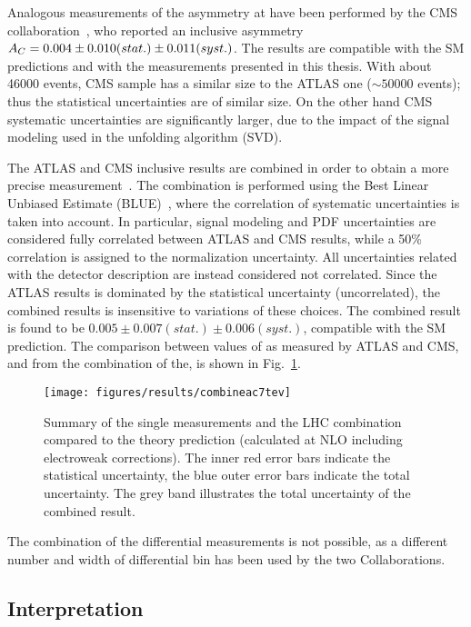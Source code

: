 Analogous measurements of the asymmetry \ac{} at \seventev{} have been
performed by the CMS collaboration~\cite{Chatrchyan:2012cxa}, who
reported an inclusive asymmetry
$A_C{}=0.004\pm0.010(stat.)\pm0.011(syst.)$.
The results are compatible with the SM predictions and with the
measurements presented in this thesis. 
With about 46000 \ttbar{} events, CMS sample has a similar size to the
ATLAS one ($\sim50000$ events); thus the statistical uncertainties are
of similar size. On the other hand CMS systematic uncertainties are
significantly larger, due to the impact of the signal modeling used in the
unfolding algorithm (SVD).

The ATLAS and CMS inclusive \ac{} results are combined in order to
obtain a more precise measurement~\cite{ATLAS-CONF-2014-012}. The
combination is performed using the Best Linear Unbiased Estimate
(BLUE)~\cite{Lyons:1988rp,Valassi:2003mu}, where the correlation of
systematic uncertainties is taken into account. In particular, signal
modeling and PDF uncertainties are considered fully correlated between
ATLAS and CMS results, while a 50\% correlation is assigned to the
\wjets{} normalization uncertainty. All uncertainties related with the
detector description are instead considered not correlated. Since the
ATLAS results is dominated by the statistical uncertainty
(uncorrelated), the combined results is insensitive to variations of
these choices. The combined result is found to be
$0.005\pm0.007(stat.)\pm0.006(syst.)$, compatible with the SM
prediction. The comparison between values of \ac{} as measured by
ATLAS and CMS, and from the combination of the, is shown in
Fig.~\ref{fig:combineac}.
\begin{figure}[!htb]\centering
  \texttt{[image: figures/results/combineac7tev]} 
  \caption{Summary of the single \ac{} measurements and the LHC
    combination compared to the theory prediction (calculated at NLO
    including electroweak corrections). The inner red error bars
    indicate the statistical uncertainty, the blue outer error bars
    indicate the total uncertainty. The grey band illustrates the
    total uncertainty of the combined result.} 
  \label{fig:combineac}
\end{figure}
The combination of the differential measurements is not possible, as a
different number and width of differential bin has been used by the
two Collaborations.

\subsection{Interpretation}

